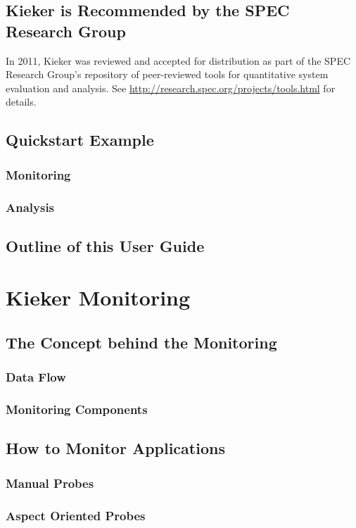 \documentclass[paper=a4,twoside=false,fontsize=11pt,numbers=noenddot,version=first,bibliography=totoc,headsepline]{scrbook}
\begin{document}
		\section{Kieker is Recommended by the SPEC Research Group}
			In 2011, Kieker was reviewed and accepted for distribution as part of the SPEC Research Group's repository of peer-reviewed tools for quantitative system evaluation and analysis. See \url{http://research.spec.org/projects/tools.html} for details.
		
		\section{Quickstart Example}
			\subsection{Monitoring}
			\subsection{Analysis}
		\section{Outline of this User Guide}

	\chapter{Kieker Monitoring}\label{chp:Monitoring}
		\section{The Concept behind the Monitoring}
			\subsection{Data Flow}
			\subsection{Monitoring Components}
		\section{How to Monitor Applications}
			\subsection{Manual Probes}
			\subsection{Aspect Oriented Probes}
\end{document}
